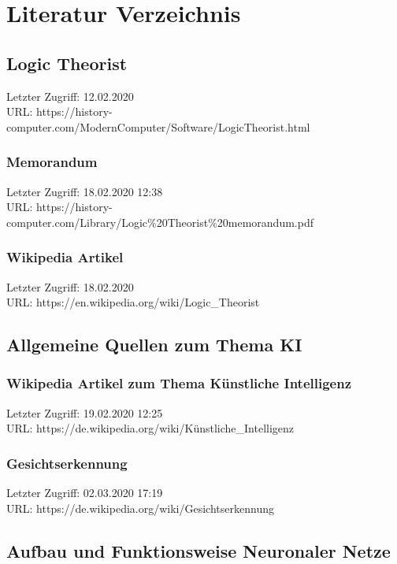 \section{Literatur Verzeichnis}
\label{sec:literatur}

\subsection{Logic Theorist}
\label{bib:LogicTheorist}
	Letzter Zugriff: 12.02.2020\\
	URL: https://history-computer.com/ModernComputer/Software/LogicTheorist.html

	\subsubsection{Memorandum}
	\label{LogicTheorist:Memorandum}
		Letzter Zugriff: 18.02.2020 12:38\\
		URL: https://history-computer.com/Library/Logic\%20Theorist\%20memorandum.pdf
		
	\subsubsection{Wikipedia Artikel}
	\label{LogicTheorist:Wikipedia}
	Letzter Zugriff: 18.02.2020\\
	URL: https://en.wikipedia.org/wiki/Logic\_Theorist

\subsection{Allgemeine Quellen zum Thema KI}
\label{bib:AllgeimeineQuellen}
		\subsubsection{Wikipedia Artikel zum Thema Künstliche Intelligenz}
		\label{wiki:KuenstlicheIntelligenz}
		Letzter Zugriff: 19.02.2020 12:25\\
		URL: https://de.wikipedia.org/wiki/Künstliche\_Intelligenz

		\subsubsection{Gesichtserkennung}
		\label{wiki:face_recognition}
		Letzter Zugriff: 02.03.2020 17:19\\
		URL: https://de.wikipedia.org/wiki/Gesichtserkennung
	
\subsection{Aufbau und Funktionsweise Neuronaler Netze}		
\label{subsec:Aufbau_Funktion_Neuronaler_Netze}
